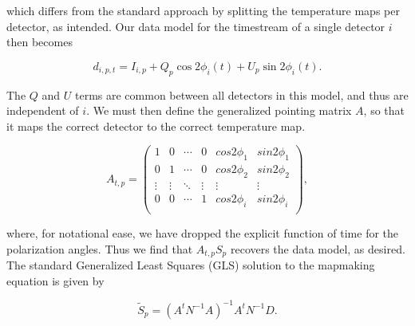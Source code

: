 \documentclass{aa}
\begin{document}
which differs from the standard approach by splitting the temperature maps per detector, as intended. Our data model for the timestream of a single detector $i$ then becomes

\begin{equation}
d_{i,p,t} = I_{i,p} + Q_p \cos2\phi_i(t) + U_p \sin2\phi_i(t).
\label{eq:datamodel}
\end{equation}

The $Q$ and $U$ terms are common between all detectors in this model, and thus are independent of $i$. We must then define the generalized pointing matrix $A$, so that it maps the correct detector to the correct temperature map.

\begin{equation}
A_{t,p} = \begin{pmatrix}
1 & 0 & \cdots & 0 & cos2\phi_1 & sin2\phi_1 \\
0 & 1 & \cdots & 0 & cos2\phi_2 & sin2\phi_2 \\
\vdots & \vdots & \ddots & \vdots & \vdots & \vdots \\
0 & 0 & \cdots & 1 & cos2\phi_i & sin2\phi_i \\
\end{pmatrix},
\end{equation}

where, for notational ease, we have dropped the explicit function of time for the polarization angles. Thus we find that $A_{t,p} S_p$ recovers the data model, as desired. The standard Generalized Least Squares (GLS) solution to the mapmaking equation is given by

\begin{equation}
\tilde{S}_p = (A^t N^{-1}A)^{-1} A^tN^{-1}D.
\label{eq:gls}
\end{equation}
\end{document}
